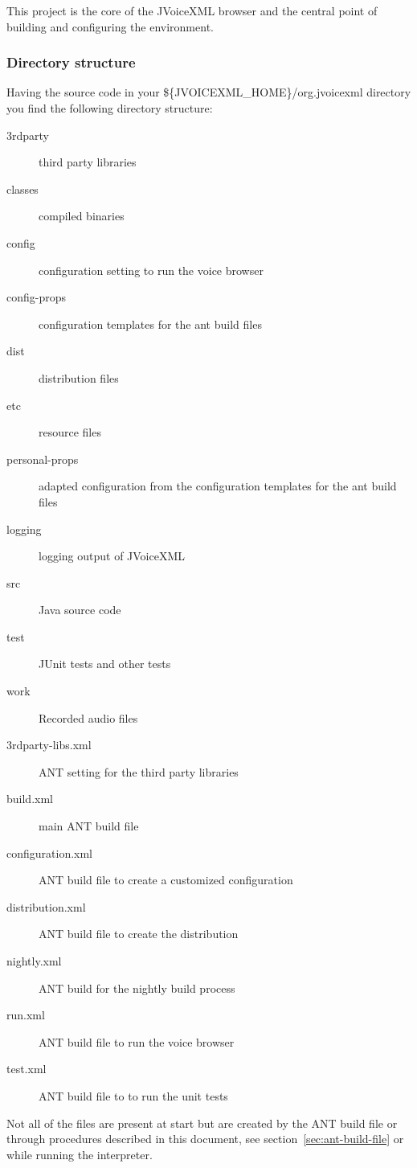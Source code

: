 \documentclass[11pt,a4paper]{article}
\begin{document}
This project is the core of the JVoiceXML browser and the central point of
building and configuring the environment.

\subsubsection{Directory structure}
\label{sec:directory-structure}

Having the source code in your \$\{JVOICEXML\_HOME\}/org.jvoicexml
directory you find the following directory structure:

\begin{description}
\item[3rdparty] third party libraries
\item[classes] compiled binaries
\item[config] configuration setting to run the voice browser
\item[config-props] configuration templates for the ant build files
\item[dist] distribution files
\item[etc] resource files
\item[personal-props] adapted configuration from the configuration templates
for the ant build files
\item[logging] logging output of JVoiceXML
\item[src] Java source code
\item[test] JUnit tests and other tests
\item[work] Recorded audio files
\item[3rdparty-libs.xml] ANT setting for the third party libraries
\item[build.xml] main ANT build file
\item[configuration.xml] ANT build file to create a customized configuration
\item[distribution.xml] ANT build file to create the distribution
\item[nightly.xml] ANT build for the nightly build process
\item[run.xml] ANT build file to run the voice browser
\item[test.xml] ANT build file to to run the unit tests
\end{description}

Not all of the files are present at start but are created by the
ANT build file or through procedures described in this 
document, see section~\ref{sec:ant-build-file} or while running the interpreter.
\end{document}
